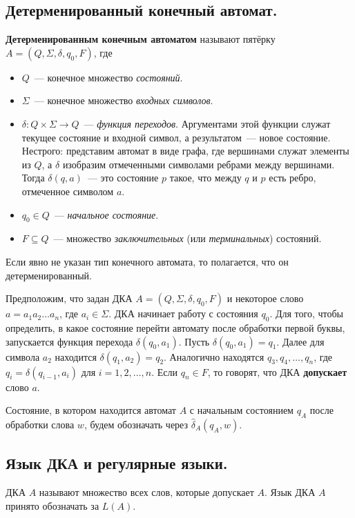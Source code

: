 \documentclass[a4paper,12pt]{article}
\begin{document}
	
	\subsection{Детерменированный конечный автомат.}
	\textbf{Детерменированным конечным автоматом} называют пятёрку $A = (Q, \Sigma, \delta, q_0, F)$, где 
	\begin{itemize}
		\item $Q$~--- конечное множество \textit{состояний}.
		\item $\Sigma$~--- конечное множество \textit{входных символов}.
		\item $\delta : Q \times \Sigma \to Q$~--- \textit{функция переходов}. Аргументами этой функции служат текущее состояние и входной символ, а результатом~--- новое состояние. Нестрого: представим автомат в виде графа, где вершинами служат элементы из $Q$, а $\delta$ изобразим отмеченными символами ребрами между вершинами. Тогда $\delta(q, a)$~--- это состояние $p$ такое, что между $q$ и $p$ есть ребро, отмеченное символом $a$.
		\item $q_0 \in Q$~--- \textit{начальное состояние}.
		\item $F \subseteq Q$~--- множество \textit{заключительных} (или \textit{терминальных}) состояний.
	\end{itemize}
	Если явно не указан тип конечного автомата, то полагается, что он детерменированный.
	
	Предположим, что задан ДКА $A = (Q, \Sigma, \delta, q_0, F)$ и некоторое слово $a = a_1 a_2 \ldots a_n$, где $a_i \in \Sigma$. ДКА начинает работу с состояния $q_0$. Для того, чтобы определить, в какое состояние перейти автомату после обработки первой буквы, запускается функция перехода $\delta(q_0, a_1)$. Пусть $\delta(q_0, a_1) = q_1$. Далее для символа $a_2$ находится $\delta(q_1, a_2) = q_2$. Аналогично находятся $q_3, q_4, \ldots, q_n$, где $q_i = \delta(q_{i - 1}, a_i)$  для $i = 1, 2, \ldots, n$. Если $q_n \in F$, то говорят, что ДКА \textbf{допускает} слово $a$.
	
	Состояние, в котором находится автомат $A$ с начальным состоянием $q_A$ после обработки слова $w$, будем обозначать через $\hat{\delta}_A(q_A, w)$.
	
	 \subsection{Язык ДКА и регулярные языки.}
	  ДКА $A$ называют множество всех слов, которые допускает $A$. Язык ДКА $A$ принято обозначать за $L(A)$.
	 
\end{document}
